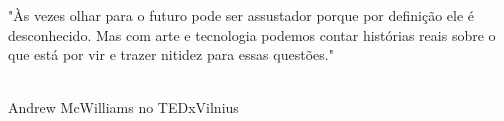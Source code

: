 %
%
\thispagestyle{empty}
\begin{epigrafe}


"Às vezes olhar para o futuro pode ser assustador porque por definição ele é desconhecido. Mas com arte e tecnologia podemos contar histórias reais sobre o que está por vir e trazer nitidez para essas questões."
{\\}{\\}

\begin{autorepigrafe}
Andrew McWilliams no TEDxVilnius
\end{autorepigrafe}

\end{epigrafe}


